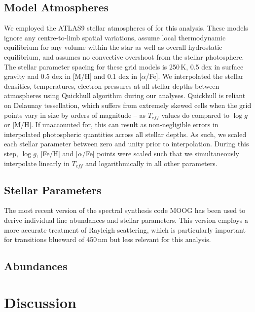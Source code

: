 \documentclass{emulateapj}
\begin{document}
\subsection{Model Atmospheres}
We employed the ATLAS9 stellar atmospheres of \citet{Castelli;Kurucz_2003} for this analysis. These models ignore any centre-to-limb spatial variations, assume local thermodynamic equilibrium for any volume within the star as well as overall hydrostatic equilibrium, and assumes no convective overshoot from the stellar photosphere. The stellar parameter spacing for these grid models is 250\,K, 0.5 dex in surface gravity and 0.5 dex in [M/H] and 0.1 dex in [$\alpha$/Fe]. We interpolated the stellar densities, temperatures, electron pressures at all stellar depths between atmospheres using Quickhull algorithm during our analyses. Quickhull is reliant on Delaunay tessellation, which suffers from extremely skewed cells when the grid points vary in size by orders of magnitude -- as $T_{eff}$ values do compared to $\log{g}$ or [M/H]. If unaccounted for, this can result as non-negligible errors in interpolated photospheric quantities across all stellar depths. As such, we scaled each stellar parameter between zero and unity prior to interpolation. During this step, $\log{g}$, [Fe/H] and [$\alpha$/Fe] points were scaled such that we simultaneously interpolate linearly in $T_{eff}$ and logarithmically in all other parameters.

\subsection{Stellar Parameters}
The most recent version of the spectral synthesis code MOOG \citep{Sneden;et-al_1973, Sobeck;et-al_2011} has been used to derive individual line abundances and stellar parameters. This version employs a more accurate treatment of Rayleigh scattering, which is particularly important for transitions blueward of 450\,nm but less relevant for this analysis.



\subsection{Abundances}

\section{Discussion}
\end{document}
